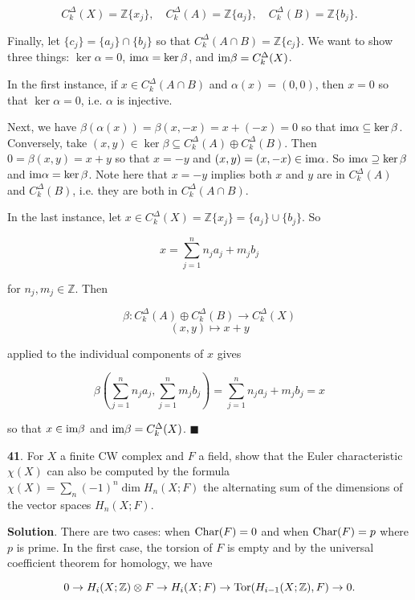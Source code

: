 \documentclass{article}
\newcommand{\Z}{\mathbb{Z}}
\newcommand{\Tor}{\textnormal{Tor}}
\newcommand{\Char}{\textnormal{Char}}
\newcommand{\im}{\textnormal{im}}
\begin{document}
$$C_{k}^{\Delta}(X) = \Z \{x_{j}\},\quad C_{k}^{\Delta}(A) = \Z \{a_{j}\},\quad C_{k}^{\Delta}(B) = \Z \{b_{j}\}.$$

Finally, let $\{c_{j}\} = \{a_{j}\}\cap \{b_{j}\}$ so that $C_{k}^{\Delta}(A\cap B) = \Z \{c_{j}\}$. We want to show three things: $\ker \alpha = 0$, $\im \alpha = \ker \beta$, and $\im \beta = C_{k}^{\Delta}(X)$.
\medskip

In the first instance, if $x\in C_{k}^{\Delta}(A\cap B)$ and $\alpha(x) = (0, 0)$, then $x = 0$ so that $\ker \alpha = 0$, i.e. $\alpha$ is injective.
\medskip

Next, we have $\beta(\alpha(x)) = \beta(x, -x) = x + (-x) = 0$ so that $\im \alpha\subseteq \ker \beta$. Conversely, take $(x, y)\in \ker \beta\subseteq C_{k}^{\Delta}(A)\oplus C_{k}^{\Delta}(B)$. Then $0 = \beta(x, y) = x + y$ so that $x = -y$ and $(x, y) = (x, -x)\in \im \alpha$. So $\im \alpha\supseteq \ker \beta$ and $\im \alpha = \ker \beta$. Note here that $x = -y$ implies both $x$ and $y$ are in $C_{k}^{\Delta}(A)$ and $C_{k}^{\Delta}(B)$, i.e. they are both in $C_{k}^{\Delta}(A\cap B)$.
\medskip

In the last instance, let $x\in C_{k}^{\Delta}(X) = \Z\{x_{j}\} = \{a_{j}\}\cup \{b_{j}\}$. So

$$x = \sum_{j=1}^{n}n_{j}a_{j} + m_{j}b_{j}$$

for $n_{j},m_{j}\in \Z$. Then

$$\beta: C_{k}^{\Delta}(A)\oplus C_{k}^{\Delta}(B)\to C_{k}^{\Delta}(X)$$
$$(x, y)\mapsto x + y$$

applied to the individual components of $x$ gives

$$\beta\left(\sum_{j=1}^{n}n_{j}a_{j}, \sum_{j=1}^{n}m_{j}b_{j}\right) = \sum_{j=1}^{n}n_{j}a_{j} + m_{j}b_{j} = x$$

so that $x\in \im \beta$ and $\im \beta = C_{k}^{\Delta}(X)$. $\blacksquare$
\bigskip
\bigskip

\textbf{41}. For $X$ a finite CW complex and $F$ a field, show that the Euler characteristic $\chi(X)$ can also be computed by the formula $\chi(X) = \sum_{n}(-1)^{n} \dim H_{n}(X;F)$ the alternating sum of the dimensions of the vector spaces $H_{n}(X;F)$.
\medskip

\textbf{Solution}. There are two cases: when $\Char(F) = 0$ and when $\Char(F) = p$ where $p$ is prime. In the first case, the torsion of $F$ is empty and by the universal coefficient theorem for homology, we have

$$0\to H_{i}(X; \Z)\otimes F\to H_{i}(X; F)\to \Tor(H_{i-1}(X; \Z), F)\to 0.$$
\end{document}
